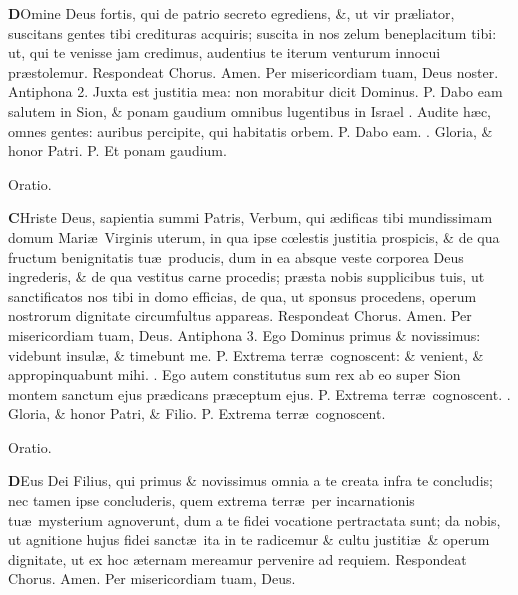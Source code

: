 \documentclass[letter,11pt]{book}
\makeatletter
\DeclareRobustCommand{\Vbar}{\vers@resp{-0.1em}{V}}
\newcommand{\vers@resp@sym}{\raisebox{0.2ex}{\rotatebox[origin=c]{-20}{$\m@th\rceil$}}}
\newcommand{\vers@resp}[2]{%
  {\ooalign{\hidewidth\kern#1\vers@resp@sym\hidewidth\cr#2\cr}}%
}%
\def\P{\color{Red} P. \color{black}}
\def\V{\color{Red} \Vbar . \color{black}}
\makeatother
\begin{document}
\begin{multicols}{2}
\lettrine[lines=2]{\bfseries \color{Red} D}{}Omine Deus fortis, qui de patrio secreto egrediens, \&, ut vir pr\ae liator, suscitans gentes tibi credituras acquiris; suscita in nos zelum beneplacitum tibi: ut, qui te venisse jam credimus, audentius te iterum venturum innocui pr\ae stolemur. \color{Red} Respondeat Chorus. \color{black} Amen. Per misericordiam tuam, Deus noster.
\newline \color{Red} Antiphona 2. \color{black} Juxta est justitia mea: non morabitur dicit Dominus. \P Dabo eam salutem in Sion, \& ponam gaudium omnibus lugentibus in Israel \V Audite h\ae c, omnes gentes: auribus percipite, qui habitatis orbem. \P Dabo eam. \V Gloria, \& honor Patri. \P Et ponam gaudium.
\vspace{-.5em} \begin{center} \color{Red} Oratio. \color{black} \end{center} \vspace{-.5em}
\lettrine[lines=2]{\bfseries \color{Red} C}{}Hriste Deus, sapientia summi Patris, Verbum, qui \ae dificas tibi mundissimam domum Mari\ae \ Virginis uterum, in qua ipse c\oe lestis justitia prospicis, \& de qua fructum benignitatis tu\ae \ producis, dum in ea absque veste corporea Deus ingrederis, \& de qua vestitus carne procedis; pr\ae sta nobis supplicibus tuis, ut sanctificatos nos tibi in domo efficias, de qua, ut sponsus procedens, operum nostrorum dignitate circumfultus appareas. \color{Red} Respondeat Chorus. \color{black} Amen. Per misericordiam tuam, Deus.
\newline \color{Red} Antiphona 3. \color{black} Ego Dominus primus \& novissimus: videbunt insul\ae , \& timebunt me. \P Extrema terr\ae \ cognoscent: \& venient, \& appropinquabunt mihi. \V Ego autem constitutus sum rex ab eo super Sion montem sanctum ejus pr\ae dicans pr\ae ceptum ejus. \P Extrema terr\ae \ cognoscent. \V Gloria, \& honor Patri, \& Filio. \P Extrema terr\ae \ cognoscent.
\vspace{-.5em} \begin{center} \color{Red} Oratio. \color{black} \end{center} \vspace{-.5em}
\lettrine[lines=2]{\bfseries \color{Red} D}{}Eus Dei Filius, qui primus \& novissimus omnia a te creata infra te concludis; nec tamen ipse concluderis, quem extrema terr\ae \ per incarnationis tu\ae \ mysterium agnoverunt, dum a te fidei vocatione pertractata sunt; da nobis, ut agnitione hujus fidei sanct\ae \ ita in te radicemur \& cultu justiti\ae \ \& operum dignitate, ut ex hoc \ae ternam mereamur pervenire ad requiem. \color{Red} Respondeat Chorus. \color{black} Amen. Per misericordiam tuam, Deus.

\end{multicols}
\end{document}
